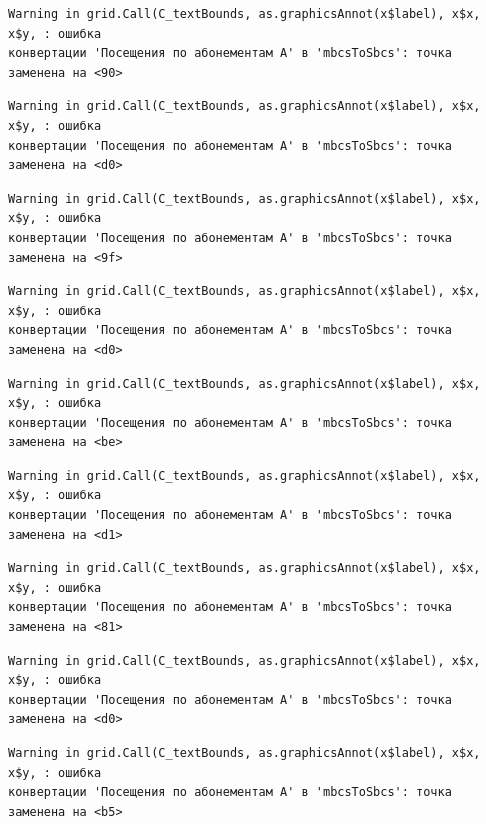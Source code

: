 \documentclass[
  letterpaper,
  DIV=11,
  numbers=noendperiod]{scrreprt}
\begin{document}
\begin{verbatim}
Warning in grid.Call(C_textBounds, as.graphicsAnnot(x$label), x$x, x$y, : ошибка
конвертации 'Посещения по абонементам А' в 'mbcsToSbcs': точка заменена на <90>
\end{verbatim}

\begin{verbatim}
Warning in grid.Call(C_textBounds, as.graphicsAnnot(x$label), x$x, x$y, : ошибка
конвертации 'Посещения по абонементам А' в 'mbcsToSbcs': точка заменена на <d0>
\end{verbatim}

\begin{verbatim}
Warning in grid.Call(C_textBounds, as.graphicsAnnot(x$label), x$x, x$y, : ошибка
конвертации 'Посещения по абонементам А' в 'mbcsToSbcs': точка заменена на <9f>
\end{verbatim}

\begin{verbatim}
Warning in grid.Call(C_textBounds, as.graphicsAnnot(x$label), x$x, x$y, : ошибка
конвертации 'Посещения по абонементам А' в 'mbcsToSbcs': точка заменена на <d0>
\end{verbatim}

\begin{verbatim}
Warning in grid.Call(C_textBounds, as.graphicsAnnot(x$label), x$x, x$y, : ошибка
конвертации 'Посещения по абонементам А' в 'mbcsToSbcs': точка заменена на <be>
\end{verbatim}

\begin{verbatim}
Warning in grid.Call(C_textBounds, as.graphicsAnnot(x$label), x$x, x$y, : ошибка
конвертации 'Посещения по абонементам А' в 'mbcsToSbcs': точка заменена на <d1>
\end{verbatim}

\begin{verbatim}
Warning in grid.Call(C_textBounds, as.graphicsAnnot(x$label), x$x, x$y, : ошибка
конвертации 'Посещения по абонементам А' в 'mbcsToSbcs': точка заменена на <81>
\end{verbatim}

\begin{verbatim}
Warning in grid.Call(C_textBounds, as.graphicsAnnot(x$label), x$x, x$y, : ошибка
конвертации 'Посещения по абонементам А' в 'mbcsToSbcs': точка заменена на <d0>
\end{verbatim}

\begin{verbatim}
Warning in grid.Call(C_textBounds, as.graphicsAnnot(x$label), x$x, x$y, : ошибка
конвертации 'Посещения по абонементам А' в 'mbcsToSbcs': точка заменена на <b5>
\end{verbatim}
\end{document}
